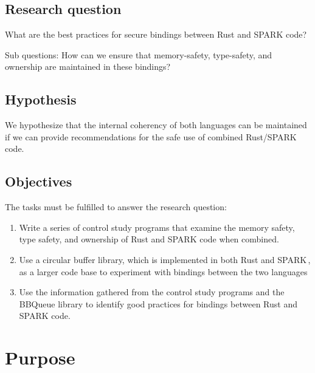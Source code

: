 \documentclass[nomenclature, english, bibtex]{kththesis}
\newcommand*{\generalExpl}[1]{\todo[inline]{#1}}
\newcommand*{\sweExpl}[1]{\todo[inline, backgroundcolor=kth-lightblue40]{#1}}  %
\begin{document}
\subsection{Research question}
\label{sec:researchQuestion}

What are the best practices for secure bindings between Rust and SPARK code?

Sub questions: How can we ensure that \first \gls{memory-safety}, \Second \gls{type-safety}, and \third \gls{ownership} are maintained in these bindings?

\subsection{Hypothesis}
We hypothesize that the internal coherency of both languages can be maintained if we can provide recommendations for the safe use of combined Rust/SPARK code.

\subsection{Objectives}
The tasks must be fulfilled to answer the research question:
\begin{enumerate}
    \item Write a series of control study programs that examine the memory safety, type safety, and ownership of Rust and SPARK code when combined.
    \item Use a circular buffer library, which is implemented in both Rust and SPARK\,\cite{munns_bbqueue_2022,chouteau_bbqueue_nodate}, as a larger code base to experiment with bindings between the two languages
    \item Use the information gathered from the control study programs and the BBQueue library to identify good practices for bindings between Rust and SPARK code.
\end{enumerate}


\section{Purpose}
\end{document}
